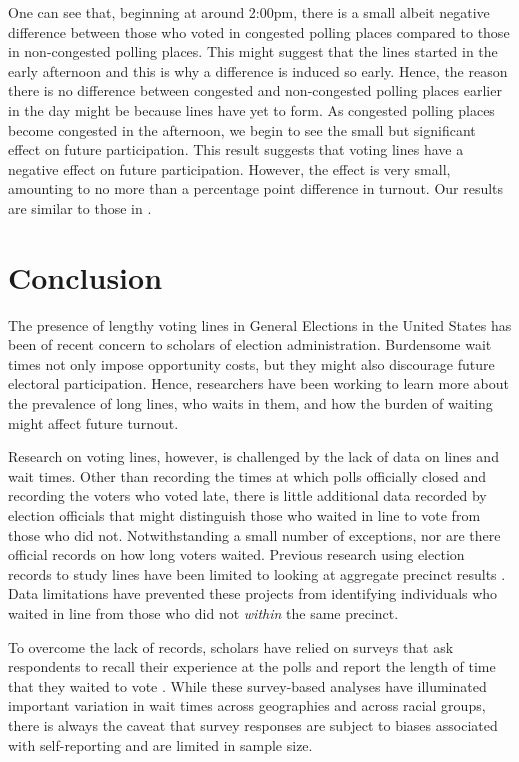 \documentclass[12pt,titlepage]{article}
\begin{document}
One can see that, beginning at around 2:00pm, there is a small albeit
negative difference between those who voted in congested polling
places compared to those in non-congested polling places.  This might
suggest that the lines started in the early afternoon and this is why
a difference is induced so early.  Hence, the reason there is no
difference between congested and non-congested polling places earlier
in the day might be because lines have yet to form. As congested
polling places become congested in the afternoon, we begin to see the
small but significant effect on future participation.  This result
suggests that voting lines have a negative effect on future
participation.  However, the effect is very small, amounting to no
more than a percentage point difference in turnout.  Our results are
similar to those in \citet{pettigrew:longlinesminorityprecincts}.

\section*{Conclusion}

The presence of lengthy voting lines in General Elections in the
United States has been of recent concern to scholars of election
administration. Burdensome wait times not only impose opportunity
costs, but they might also discourage future electoral participation.
Hence, researchers have been working to learn more about the
prevalence of long lines, who waits in them, and how the burden of
waiting might affect future turnout.

Research on voting lines, however, is challenged by the lack of data
on lines and wait times.  Other than recording the times at which
polls officially closed and recording the voters who voted late, there
is little additional data recorded by election officials that might
distinguish those who waited in line to vote from those who did not.
Notwithstanding a small number of exceptions, nor are there official
records on how long voters waited.  Previous research using election
records to study lines have been limited to looking at aggregate
precinct results \citep{herronsmith:closingtimes,
  pettigrew:longlinesminorityprecincts}.  Data limitations have
prevented these projects from identifying individuals who waited in
line from those who did not \emph{within} the same precinct.

To overcome the lack of records, scholars have relied on surveys that
ask respondents to recall their experience at the polls and report the
length of time that they waited to vote
\citep{stewart:waitingtovote2012, pettigrew:racegapwaittimes}.  While
these survey-based analyses have illuminated important variation in
wait times across geographies and across racial groups, there is
always the caveat that survey responses are subject to biases
associated with self-reporting and are limited in sample size.
\end{document}
